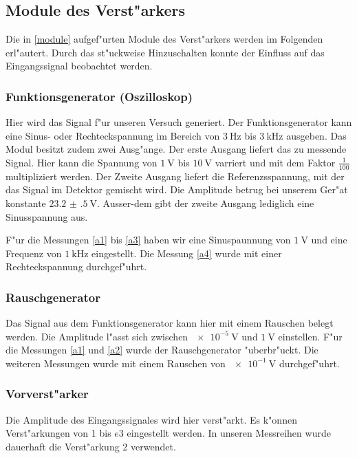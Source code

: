 \documentclass{scrartcl}
\begin{document}
		\subsection{Module des Verst"arkers}

		Die in \ref{module} aufgef"urten Module des Verst"arkers werden im Folgenden erl"autert.
		Durch das st"uckweise Hinzuschalten konnte der Einfluss auf das Eingangssignal beobachtet werden.

			\subsubsection{Funktionsgenerator (Oszilloskop)}

			Hier wird das Signal f"ur unseren Versuch generiert.
			Der Funktionsgenerator kann eine Sinus- oder Rechteckspannung im Bereich von $\SI{3}{\hertz}$ bis $\SI{3}{\kilo\hertz}$ ausgeben.
			Das Modul besitzt zudem zwei Ausg"ange. Der erste Ausgang liefert das zu messende Signal.
			Hier kann die Spannung von $\SI{1}{\volt}$ bis $\SI{10}{\volt}$ varriert und mit dem Faktor $\frac{1}{100}$ multipliziert werden.
			Der Zweite Ausgang liefert die Referenzsspannung, mit der das Signal im Detektor gemischt wird.
			Die Amplitude betrug bei unserem Ger"at konstante $\SI{23.2(5)}{\volt}$.
			Ausser-dem gibt der zweite Ausgang lediglich eine Sinusspannung aus.

			F"ur die Messungen \ref{a1} bis \ref{a3} haben wir eine Sinuspaunnung von $\SI{1}{\volt}$ und eine Frequenz von $\SI{1}{\kilo\hertz}$ eingestellt.
			Die Messung \ref{a4} wurde mit einer Rechteckspannung durchgef"uhrt.

			\subsubsection{Rauschgenerator}

			Das Signal aus dem Funktionsgenerator kann hier mit einem Rauschen belegt werden.
			Die Amplitude l"asst sich zwischen $\SI{e-5}{\volt}$ und $\SI{1}{\volt}$ einstellen.
			F"ur die Messungen \ref{a1} und \ref{a2} wurde der Rauschgenerator "uberbr"uckt. Die weiteren Messungen wurde mit einem Rauschen von $\SI{e-1}{\volt}$ durchgef"uhrt.

			\subsubsection{Vorverst"arker}

			Die Amplitude des Eingangssignales wird hier verst"arkt. Es k"onnen Verst"arkungen von 1 bis $e3$ eingestellt werden.
			In unseren Messreihen wurde dauerhaft die Verst"arkung 2 verwendet.
\end{document}
